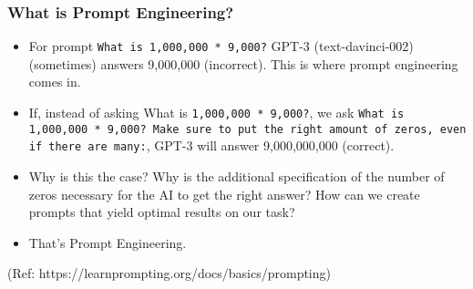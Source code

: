 

\begin{frame}[fragile]\frametitle{What is Prompt Engineering?}

\begin{itemize}
\item For prompt \lstinline|What is 1,000,000 * 9,000?| GPT-3 (text-davinci-002) (sometimes) answers 9,000,000 (incorrect). This is where prompt engineering comes in.
\item If, instead of asking What is \lstinline|1,000,000 * 9,000?|, we ask \lstinline|What is 1,000,000 * 9,000? Make sure to put the right amount of zeros, even if there are many:|, GPT-3 will answer 9,000,000,000 (correct). 
\item Why is this the case? Why is the additional specification of the number of zeros necessary for the AI to get the right answer? How can we create prompts that yield optimal results on our task? 			
\item That's Prompt Engineering.
\end{itemize}

{\tiny (Ref: https://learnprompting.org/docs/basics/prompting)}
\end{frame}








			
			







